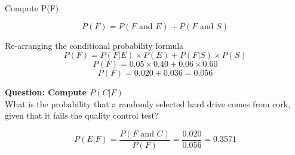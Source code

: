 \noindent Compute P(F) 

\[P(F) = P(F \mbox{ and } E) + P(F\mbox{ and }S)\]


\noindent Re-arranging the conditional probability formula
\[P(F) = P(F|E)\times P(E) +  P(F|S)\times P(S) \]
\[P(F) = 0.05 \times 0.40 +  0.06 \times 0.60 \]
\[P(F) = 0.020  +  0.036 = \boldsymbol{0.056}
\]

\noindent \textbf{Question: Compute $P(C|F)$ }
\\ What is the probability that a randomly selected hard drive comes from cork, given that it fails the quality control test?

\[P(E|F) = \frac{P(F\mbox{ and }C)}{P(F)} = \frac{0.020}{0.056} = \boldsymbol{0.3571} \]
\bigskip

